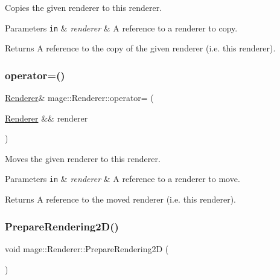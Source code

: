 Copies the given renderer to this renderer.


\begin{DoxyParams}[1]{Parameters}
\mbox{\tt in}  & {\em renderer} & A reference to a renderer to copy. \\
\hline
\end{DoxyParams}
\begin{DoxyReturn}{Returns}
A reference to the copy of the given renderer (i.\+e. this renderer). 
\end{DoxyReturn}
\hypertarget{classmage_1_1_renderer_aa381bb89bffdc8ea2d8e3625e28cd28a}{}\label{classmage_1_1_renderer_aa381bb89bffdc8ea2d8e3625e28cd28a} 
\subsubsection{\texorpdfstring{operator=()}{operator=()}\hspace{0.1cm}{\footnotesize\ttfamily [2/2]}}
{\footnotesize\ttfamily \hyperlink{classmage_1_1_renderer}{Renderer}\& mage\+::\+Renderer\+::operator= (\begin{DoxyParamCaption}\item[{\hyperlink{classmage_1_1_renderer}{Renderer} \&\&}]{renderer }\end{DoxyParamCaption})\hspace{0.3cm}{\ttfamily [delete]}}

Moves the given renderer to this renderer.


\begin{DoxyParams}[1]{Parameters}
\mbox{\tt in}  & {\em renderer} & A reference to a renderer to move. \\
\hline
\end{DoxyParams}
\begin{DoxyReturn}{Returns}
A reference to the moved renderer (i.\+e. this renderer). 
\end{DoxyReturn}
\hypertarget{classmage_1_1_renderer_a716c5ef70f425269de95db07c9ecdbfa}{}\label{classmage_1_1_renderer_a716c5ef70f425269de95db07c9ecdbfa} 
\subsubsection{\texorpdfstring{Prepare\+Rendering2\+D()}{PrepareRendering2D()}}
{\footnotesize\ttfamily void mage\+::\+Renderer\+::\+Prepare\+Rendering2D (\begin{DoxyParamCaption}{ }\end{DoxyParamCaption})}


